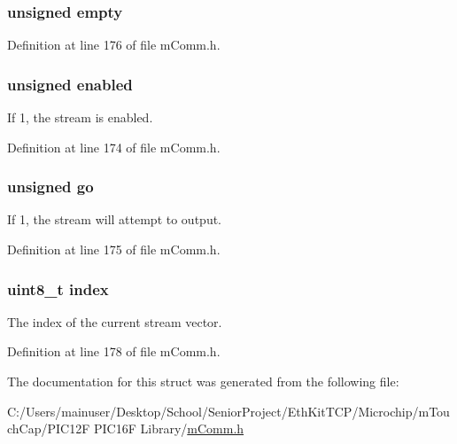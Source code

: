 \subsubsection[{empty}]{\setlength{\rightskip}{0pt plus 5cm}unsigned empty}\label{structm_comm___stream_config_ae37c23a4ce1b446693db111c22c80f08}


Definition at line 176 of file m\+Comm.\+h.

\hypertarget{structm_comm___stream_config_a50101089d91b712b53825d25ab0a5a2a}{}
\subsubsection[{enabled}]{\setlength{\rightskip}{0pt plus 5cm}unsigned enabled}\label{structm_comm___stream_config_a50101089d91b712b53825d25ab0a5a2a}


If \textquotesingle{}1\textquotesingle{}, the stream is enabled. 



Definition at line 174 of file m\+Comm.\+h.

\hypertarget{structm_comm___stream_config_a3444acdcb503f16a81374dd25b4d894e}{}
\subsubsection[{go}]{\setlength{\rightskip}{0pt plus 5cm}unsigned go}\label{structm_comm___stream_config_a3444acdcb503f16a81374dd25b4d894e}


If \textquotesingle{}1\textquotesingle{}, the stream will attempt to output. 



Definition at line 175 of file m\+Comm.\+h.

\hypertarget{structm_comm___stream_config_aae5a12e607d0f782506d9e6ec6179c64}{}
\subsubsection[{index}]{\setlength{\rightskip}{0pt plus 5cm}uint8\+\_\+t index}\label{structm_comm___stream_config_aae5a12e607d0f782506d9e6ec6179c64}


The index of the current stream vector. 



Definition at line 178 of file m\+Comm.\+h.



The documentation for this struct was generated from the following file\+:\begin{DoxyCompactItemize}
\item 
C\+:/\+Users/mainuser/\+Desktop/\+School/\+Senior\+Project/\+Eth\+Kit\+T\+C\+P/\+Microchip/m\+Touch\+Cap/\+P\+I\+C12\+F P\+I\+C16\+F Library/\hyperlink{m_comm_8h}{m\+Comm.\+h}\end{DoxyCompactItemize}

